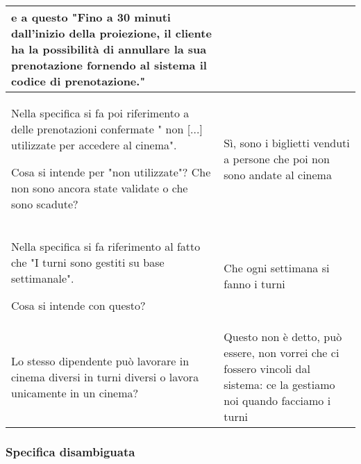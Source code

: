 \begin{longtable}{|p{8.15cm}|p{8.15cm}|}
    e a questo "Fino a 30 minuti dall'inizio della proiezione, il cliente ha
    la possibilità di annullare la sua prenotazione fornendo al sistema il
    codice di prenotazione."
    \\\hline
    Nella specifica si fa poi riferimento a delle
    prenotazioni confermate " non  [...] utilizzate per accedere al cinema".

    Cosa si intende per "non utilizzate"? Che non sono ancora state
    validate o che sono scadute?
     & Sì, sono i biglietti venduti a persone che poi non sono andate al cinema
    \\\hline
    Nella specifica si fa riferimento al fatto che
    "I turni sono gestiti su base settimanale".

    Cosa si intende con questo?
     & Che ogni settimana si fanno i turni
    \\\hline
    Lo stesso dipendente può lavorare in cinema diversi in turni diversi o
    lavora unicamente in un cinema?
     & Questo non è detto, può essere, non vorrei che ci fossero vincoli dal
    sistema: ce la gestiamo noi quando facciamo i turni
    \\\hline
\end{longtable}

\pagebreak
\subsubsection*{Specifica disambiguata}

